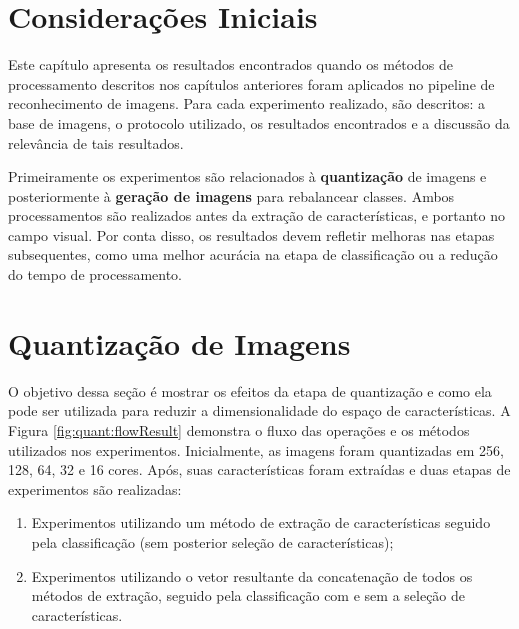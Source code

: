 
\section{Considerações Iniciais}

Este capítulo apresenta os resultados encontrados quando os métodos de processamento descritos nos capítulos anteriores foram aplicados no pipeline de reconhecimento de imagens. Para cada experimento realizado, são descritos: a base de imagens, o protocolo utilizado, os resultados encontrados e a discussão da relevância de tais resultados.

Primeiramente os experimentos são relacionados à \textbf{quantização} de imagens e posteriormente à \textbf{geração de imagens} para rebalancear classes. Ambos processamentos são realizados antes da extração de características, e portanto no campo visual. Por conta disso, os resultados devem refletir melhoras nas etapas subsequentes, como uma melhor acurácia na etapa de classificação ou a redução do tempo de processamento.

\section{Quantização de Imagens}

O objetivo dessa seção é mostrar os efeitos da etapa de quantização e como ela pode ser utilizada para reduzir a dimensionalidade do espaço de características. A Figura \ref{fig:quant:flowResult} demonstra o fluxo das operações e os métodos utilizados nos experimentos. Inicialmente, as imagens foram quantizadas em 256, 128, 64, 32 e 16 cores. Após, suas características foram extraídas e duas etapas de experimentos são realizadas:

\begin{enumerate}
  \item Experimentos utilizando um método de extração de características seguido pela classificação (sem posterior seleção de características);
  \item Experimentos utilizando o vetor resultante da concatenação de todos os métodos de extração, seguido pela classificação com e sem a seleção de características.
\end{enumerate}

